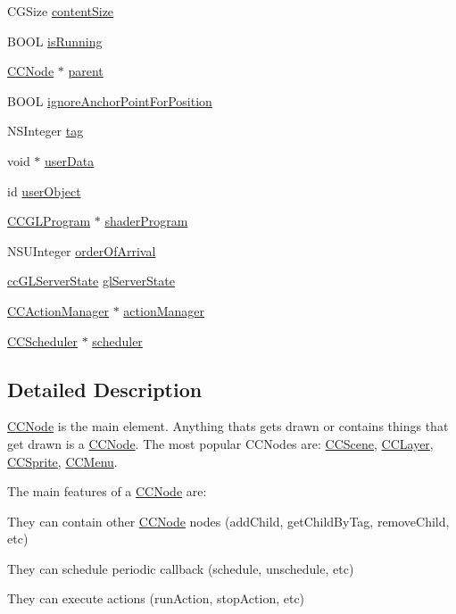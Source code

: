 \begin{DoxyCompactItemize}
C\-G\-Size \hyperlink{class_c_c_node_a7b80fa1c9ea5db76137ed9e73646ba25}{content\-Size}
\item 
B\-O\-O\-L \hyperlink{class_c_c_node_a0ef88eaa1917c87173866f76dac006b3}{is\-Running}
\item 
\hyperlink{class_c_c_node}{C\-C\-Node} $\ast$ \hyperlink{class_c_c_node_a9504c37bbc9d2ca93c34784383b21a26}{parent}
\item 
B\-O\-O\-L \hyperlink{class_c_c_node_a1798f20ed00ae4514ab7f2fc9ffe7e2b}{ignore\-Anchor\-Point\-For\-Position}
\item 
N\-S\-Integer \hyperlink{class_c_c_node_a4ed1d0596afb7822a87e41b75b496af3}{tag}
\item 
void $\ast$ \hyperlink{class_c_c_node_aa59560e27cc9c1cc51f95def93c60125}{user\-Data}
\item 
id \hyperlink{class_c_c_node_a34b5b9ac2ad6129cae7cbdedfe6f12a1}{user\-Object}
\item 
\hyperlink{interface_c_c_g_l_program}{C\-C\-G\-L\-Program} $\ast$ \hyperlink{class_c_c_node_a6a14e4b8be7ff8fc766730abc73ce795}{shader\-Program}
\item 
N\-S\-U\-Integer \hyperlink{class_c_c_node_ae56cef8bc876f9f4d609266bc0f80a29}{order\-Of\-Arrival}
\item 
\hyperlink{cc_g_l_state_cache_8h_af395552034661147c3a67a20581a6294}{cc\-G\-L\-Server\-State} \hyperlink{class_c_c_node_ad0146f65e6d5edeee5bf80466d4cd738}{gl\-Server\-State}
\item 
\hyperlink{interface_c_c_action_manager}{C\-C\-Action\-Manager} $\ast$ \hyperlink{class_c_c_node_a23baea124da6113f8c3fe95b6f8eaa52}{action\-Manager}
\item 
\hyperlink{class_c_c_scheduler}{C\-C\-Scheduler} $\ast$ \hyperlink{class_c_c_node_a497798cf2d62b8b107069ff0fc1a07d0}{scheduler}
\end{DoxyCompactItemize}


\subsection{Detailed Description}
\hyperlink{class_c_c_node}{C\-C\-Node} is the main element. Anything thats gets drawn or contains things that get drawn is a \hyperlink{class_c_c_node}{C\-C\-Node}. The most popular C\-C\-Nodes are\-: \hyperlink{interface_c_c_scene}{C\-C\-Scene}, \hyperlink{class_c_c_layer}{C\-C\-Layer}, \hyperlink{class_c_c_sprite}{C\-C\-Sprite}, \hyperlink{interface_c_c_menu}{C\-C\-Menu}.

The main features of a \hyperlink{class_c_c_node}{C\-C\-Node} are\-:
\begin{DoxyItemize}
\item They can contain other \hyperlink{class_c_c_node}{C\-C\-Node} nodes (add\-Child, get\-Child\-By\-Tag, remove\-Child, etc)
\item They can schedule periodic callback (schedule, unschedule, etc)
\item They can execute actions (run\-Action, stop\-Action, etc)
\end{DoxyItemize}

